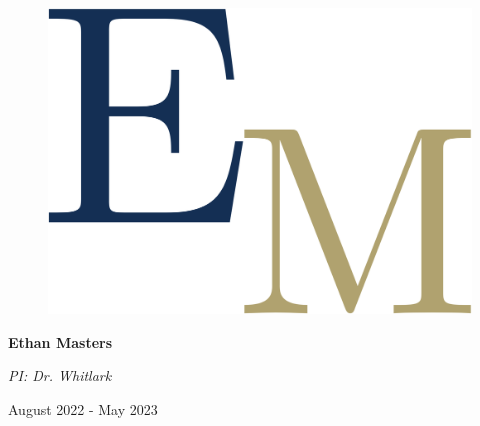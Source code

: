 \documentclass[11,5 pt]{article}
\begin{document}
\begin{titlepage}
\vspace{1.5cm}
\begin{figure}[ht!]
\centering
\includegraphics[scale=0.06]{images/Initials.png}
\end{figure}
{\bfseries\Large Ethan Masters \par}
\vspace{0.55cm}
{\Large \textit{PI: Dr. Whitlark}\par}
\vspace{1.2cm}

{\Large August 2022 - May 2023 \par}
\end{titlepage}

\renewcommand{\headrulewidth}{0.5pt}

\tableofcontents

\newpage

\begin{abstract}
    This paper examines the historical relationship between public opinion on arms control and policy decisions in the United States from 1945 to 2022. Utilizing a comparative analysis of media coverage from The New York Times and public opinion surveys, we assess how public sentiment trends align with policy actions regarding weapons of mass destruction. By analyzing historical polling data and media narratives, this research identifies key moments of alignment and divergence between public will and government actions. Our findings suggest that while public opinion has consistently leaned in favor of arms control, its salience has fluctuated, influencing policy responsiveness over time.
\end{abstract}
\end{document}
